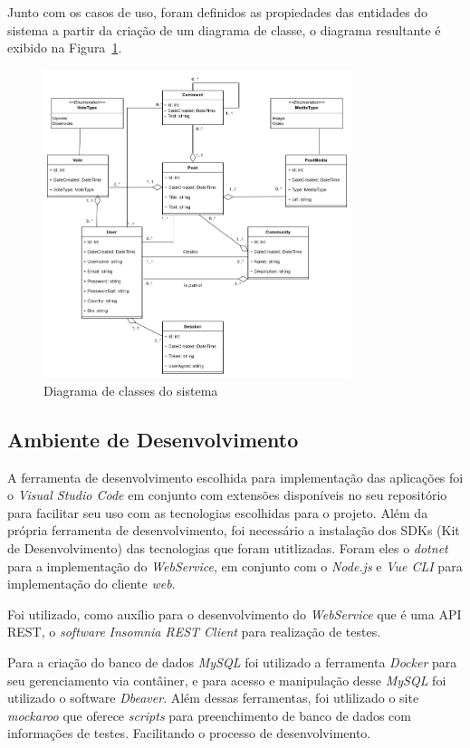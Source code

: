 \documentclass[12pt]{article}
\begin{document}
Junto com os casos de uso, foram definidos as propiedades das entidades do sistema
a partir da criação de um diagrama de classe, o diagrama resultante é exibido
na Figura~\ref{fig:classes_diagram}.

\begin{figure}[h]
    \centering
    \includegraphics[width=0.8\textwidth]{diagrams/classes_diagram.png}
    \caption{Diagrama de classes do sistema}\label{fig:classes_diagram}
\end{figure}

\subsection{Ambiente de Desenvolvimento}

A ferramenta de desenvolvimento escolhida para implementação
das aplicações foi o \textit{Visual Studio Code} em conjunto com extensões disponíveis
no seu repositório para facilitar seu uso com as tecnologias escolhidas para o projeto. Além
da própria ferramenta de desenvolvimento, foi necessário a instalação dos SDKs
(Kit de Desenvolvimento) das tecnologias que foram utitlizadas. Foram eles o \textit{dotnet} para a implementação do \textit{WebService},
em conjunto com o \textit{Node.js} e \textit{Vue CLI} para implementação do cliente \textit{web}.

Foi utilizado, como auxílio para o desenvolvimento do \textit{WebService} que é uma API REST, o
\textit{software} \textit{Insomnia REST Client} para realização de testes.

Para a criação do banco de dados \textit{MySQL} foi utilizado a ferramenta \textit{Docker} para
seu gerenciamento via contâiner, e para acesso e manipulação desse \textit{MySQL} foi utilizado o software \textit{Dbeaver}.
Além dessas ferramentas, foi utlilizado o site \textit{mockaroo} que oferece \textit{scripts} para preenchimento
de banco de dados com informações de testes. Facilitando o processo de desenvolvimento.
\end{document}
